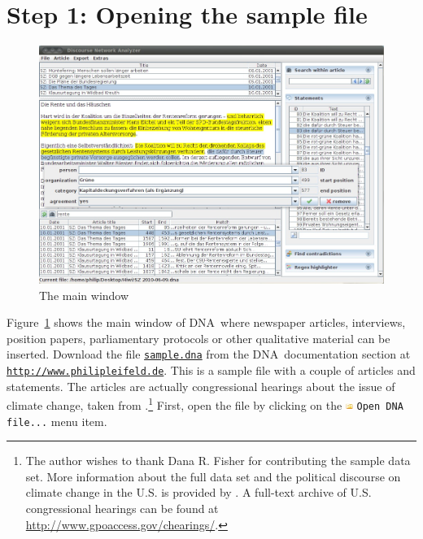 \documentclass[12pt,a4paper]{scrreprt}
\newcommand{\dnashort}{\textsc{DNA}}
\newcommand{\code}[1]{\texttt{#1}}
\begin{document}
\section*{Step 1: Opening the sample file}
\begin{figure}[t]
\begin{center}
\includegraphics[scale=0.4]{dna-main.jpg}
\end{center}
\caption{The main window}
\label{main}
\end{figure}
Figure~\ref{main} shows the main window of \dnashort\ where newspaper articles, interviews, position papers, parliamentary protocols or other qualitative material can be inserted. Download the file \href{http://www.philipleifeld.de/cms/upload/Downloads/sample.dna}{\texttt{sample.dna}} from the \dnashort\ documentation section at \href{http://www.philipleifeld.de/discourse-network-analyzer-dna/documentation/}{\texttt{http://www.philipleifeld.de}}. This is a sample file with a couple of articles and statements. The articles are actually congressional hearings about the issue of climate change, taken from \citet{fisher2009understanding}.\footnote{The author wishes to thank Dana R. Fisher for contributing the sample data set. More information about the full data set and the political discourse on climate change in the U.S. is provided by \citet{fisher2009understanding}. A full-text archive of U.S. congressional hearings can be found at \url{http://www.gpoaccess.gov/chearings/}.} First, open the file by clicking on the \includegraphics[height=9px]{icons-open.png} \code{Open DNA file...} menu item.
\end{document}
